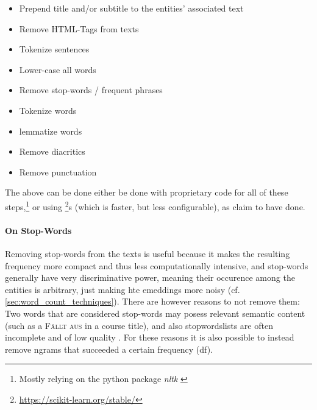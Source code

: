 \begin{itemize}
	\item Prepend title and/or subtitle to the entities' associated text 
	\item Remove HTML-Tags from texts 
	\item Tokenize sentences 
	\item Lower-case all words
	\item Remove stop-words / frequent phrases
	\item Tokenize words
	\item \Gls{lemma}tize words
	\item Remove diacritics
	\item Remove punctuation 
\end{itemize}

The above can be done either be done with proprietary code for all of these steps,\footnote{Mostly relying on the python package \emph{nltk} \cite{bird2009natural}} or using \footnote{\url{https://scikit-learn.org/stable/}}s  (which is faster, but less configurable), as \cite{Ager2018} claim to have done.

\paragraph{On Stop-Words}
Removing stop-words from the texts is useful because it makes the resulting frequency more compact and thus less computationally intensive, and stop-words generally have very discriminative power, meaning their occurence among the entities is arbitrary, just making hte emeddings more noisy (cf. \autoref{sec:word_count_techniques}). There are however reasons to not remove them: Two words that are considered stop-words may posess relevant semantic content (such as a \textsc{Fällt aus} in a course title), and also stopwordslists are often incomplete and of low quality \cite{nothman-etal-2018-stop}. For these reasons it is also possible to instead remove \glspl{ngram} that succeeded a certain frequency (\gls{df}).


